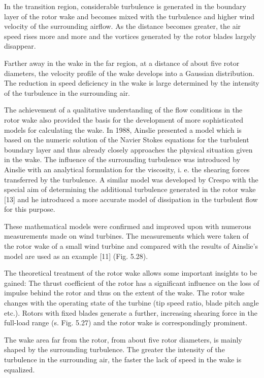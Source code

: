 In the transition region, considerable turbulence is generated in the boundary layer of the rotor wake and becomes mixed with the turbulence and higher wind velocity of the surrounding airflow. As the distance becomes greater, the air speed rises more and more and the vortices generated by the rotor blades largely disappear.

Farther away in the wake in the far region, at a distance of about five rotor diameters, the velocity profile of the wake develops into a Gaussian distribution. The reduction in speed deficiency in the wake is large determined by the intensity of the turbulence in the surrounding air.

The achievement of a qualitative understanding of the flow conditions in the rotor wake also provided the basis for the development of more sophisticated models for calculating the wake. In 1988, Ainslie presented a model which is based on the numeric solution of the Navier Stokes equations for the turbulent boundary layer and thus already closely approaches the physical situation given in the wake. The influence of the surrounding turbulence was introduced by Ainslie with an analytical formulation for the viscosity, i. e.
the shearing forces transferred by the turbulence. A similar model was developed by Crespo with the special aim of determining the additional turbulence generated in the rotor wake [13] and he introduced a more accurate model of dissipation in the turbulent flow for this
purpose.

These mathematical models were confirmed and improved upon with numerous measurements made on wind turbines. The measurements which were taken of the rotor wake of a small wind turbine and compared with the results of Ainslie’s model are used as an example [11] (Fig. 5.28).

The theoretical treatment of the rotor wake allows some important insights to be gained: The thrust coefficient of the rotor has a significant influence on the loss of impulse behind the rotor and thus on the extent of the wake. The rotor wake changes with the operating state of the turbine (tip speed ratio, blade pitch angle etc.). Rotors with fixed blades generate a further, increasing shearing force in the full-load range (s. Fig. 5.27) and the rotor wake is correspondingly prominent.

The wake area far from the rotor, from about five rotor diameters, is mainly shaped by the surrounding turbulence. The greater the intensity of the turbulence in the surrounding air, the faster the lack of speed in the wake is equalized.

